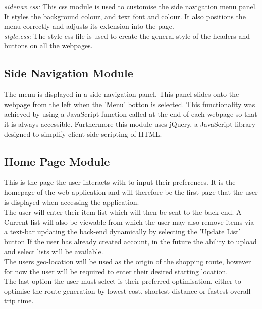 \documentclass[10pt, a4paper, onecolumn]{scrartcl}
\begin{document}
		\textit{sidenav.css:} This css module is used to customise the side navigation menu panel. It styles the background colour, and text font and colour. It also positions the menu correctly and adjusts its extension into the page.\\
		
		\textit{style.css:} The style css file is used to create the general style of the headers and buttons on all the webpages.
		
		\subsection{Side Navigation Module}
		
		The menu is displayed in a side navigation panel. This panel slides onto the webpage from the left when the 'Menu' botton is selected. This functionality was achieved by using a JavaScript function called at the end of each webpage so that it is always accessible. Furthermore this module uses jQuery, a JavaScript library designed to simplify client-side scripting of HTML.	
		
		\subsection{Home Page Module}
		
		This is the page the user interacts with to input their preferences. It is the homepage of the web application and will therefore be the first page that the user is displayed when accessing the application.\\
		
		The user will enter their item list which will then be sent to the back-end. A Current list will also be viewable from which the user may also remove items via a text-bar updating the back-end dynamically by selecting the 'Update List' button If the user has already created account, in the future the ability to upload and select lists will be available. \\
		
		The users geo-location will be used as the origin of the shopping route, however for now the user will be required to enter their desired starting location.\\
		
		The last option the user must select is their preferred optimisation, either to optimise the route generation by lowest cost, shortest distance or fastest overall trip time.\\
		
\end{document}

